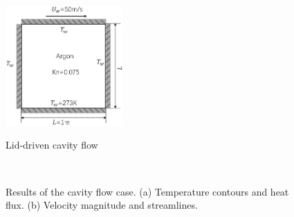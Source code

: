 \begin{figure}
  \centering
  \includegraphics[width=0.4\textwidth]{img/ldc.eps}\\
  \caption{Lid-driven cavity flow}\label{ldc}
\end{figure}

\begin{figure}[htbp]
\centering
{} ~
\caption{
Results of the cavity flow case. (a) Temperature contours and heat flux. (b) Velocity magnitude and streamlines.
}\label{ldc_UT}
\end{figure}

